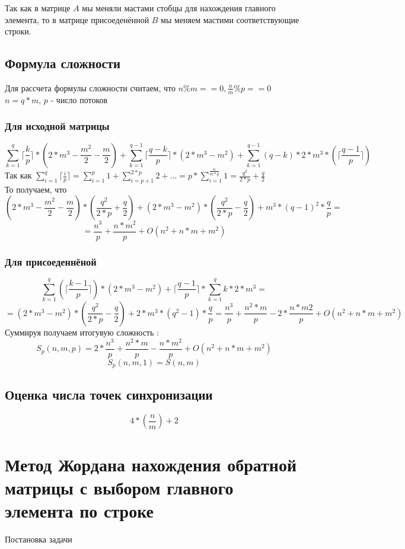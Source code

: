 \documentclass[a4paper,12pt]{article}
\begin{document}
Так как в матрице $A$ мы меняли мастами стобцы для нахождения главного элемента, то 
в матрице присоеденённой $B$ мы меняем мастими соответствующие строки.


\subsection{Формула сложности}
Для рассчета формулы сложности считаем, что $n \% m == 0, \frac{n}{m} \% p == 0$\\
$n = q * m$, $p$ - число потоков\\
\subsubsection{Для исходной матрицы}
$$\sum\limits_{k=1}^{q}\lceil \frac{k}{p} \rceil * (2 * m^{3} - \frac{m^{2}}{2} - \frac{m}{2}) +
\sum\limits_{k=1}^{q-1}\lceil \frac{q-k}{p} \rceil*(2*m^{3}-m^{2}) +
\sum\limits_{k=1}^{q-1} (q-k)*2*m^{3} * (\lceil \frac{q-1}{p} \rceil)$$
Так как $\sum\limits_{i=1}^{q}\lceil \frac{i}{p} \rceil =
\sum\limits_{i=1}^{p}1 + \sum\limits_{i=p+1}^{2*p}2 + ... = p * \sum\limits_{i=1}^{\frac{n}{m*p}}
1 = \frac{q^{2}}{2*p} + \frac{q}{2}$\\
То получаем, что 
$$(2*m^{3} - \frac{m^{2}}{2} - \frac{m}{2})*(\frac{q^{2}}{2*p} + \frac{q}{2}) + 
(2*m^{3} - m^{2}) *(\frac{q^{2}}{2*p} - \frac{q}{2}) + m^{3}*(q-1)^{2}*\frac{q}{p} = $$
$$ = \frac{n^{3}}{p} + \frac{n*m^{2}}{p} + O(n^{2} + n*m + m^{2})$$
\subsubsection{Для присоеденнёной}
$$\sum\limits_{k=1}^{q}(\lceil \frac{k-1}{p} \rceil)* (2*m^{3}-m^{2}) + \lceil \frac{q-1}{p}
\rceil * \sum\limits_{k=1}^{q}k*2*m^{3} = $$
$$= (2*m^{3} - m^{2}) * (\frac{q^{2}}{2*p}-\frac{q}{2}) + 2*m^{3}*(q^{2}-1)*\frac{q}{p} =
\frac{n^{3}}{p} + \frac{n^{2}*m}{p} - 2*\frac{n*m{2}}{p} + O(n^{2} + n*m + m^{2})$$
Суммируя получаем итогувую сложность :\\
$$S_{p}(n, m , p) = 2 * \frac{n^{3}}{p} + \frac{n^{2}*m}{p} - \frac{n*m^{2}}{p} +
O(n^{2} + n*m + m^{2})$$
$$S_{p}(n,m,1) = S(n, m)$$




\subsection{Оценка числа точек синхронизации}
$$4 * (\frac{n}{m}) + 2$$

\section{Метод Жордана нахождения обратной матрицы с выбором главного элемента по строке}
\begin{center}
{Постановка задачи}
\end{center}
\end{document}
